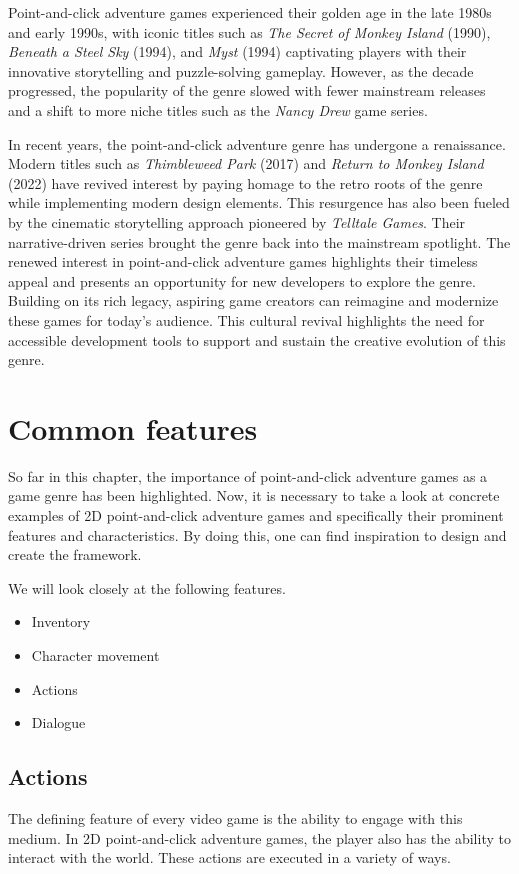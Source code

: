 Point-and-click adventure games experienced their golden age in the late 1980s and early 1990s, with iconic titles such as \textit{The Secret of Monkey Island} (1990), \textit{Beneath a Steel Sky} (1994), and \textit{Myst} (1994) captivating players with their innovative storytelling and puzzle-solving gameplay. However, as the decade progressed, the popularity of the genre slowed\cite{Qaffas202022} with fewer mainstream releases and a shift to more niche titles such as the \textit{Nancy Drew} game series.

In recent years, the point-and-click adventure genre has undergone a renaissance. Modern titles such as \textit{Thimbleweed Park} (2017) and \textit{Return to Monkey Island} (2022) have revived interest by paying homage to the retro roots of the genre while implementing modern design elements. This resurgence has also been fueled by the cinematic storytelling approach pioneered by \textit{Telltale Games}. Their narrative-driven series brought the genre back into the mainstream spotlight. The renewed interest in point-and-click adventure games highlights their timeless appeal and presents an opportunity for new developers to explore the genre. Building on its rich legacy, aspiring game creators can reimagine and modernize these games for today's audience. This cultural revival highlights the need for accessible development tools to support and sustain the creative evolution of this genre.

\section{Common features}
So far in this chapter, the importance of point-and-click adventure games as a game genre has been highlighted. Now, it is necessary to take a look at concrete examples of 2D point-and-click adventure games and specifically their prominent features and characteristics. By doing this, one can find inspiration to design and create the framework.

We will look closely at the following features.
\begin{itemize}
\item Inventory
\item Character movement
\item Actions
\item Dialogue
\end{itemize}

\subsection{Actions}
The defining feature of every video game is the ability to engage with this medium. In 2D point-and-click adventure games, the player also has the ability to interact with the world. These actions are executed in a variety of ways.

